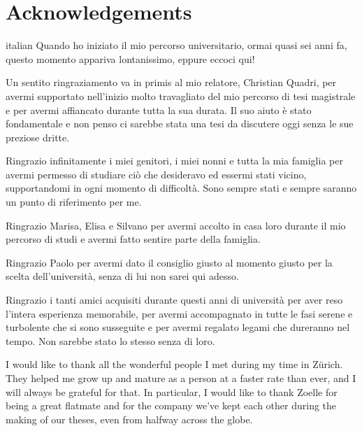{}
\chapter*{Acknowledgements}
\vspace{-0.5cm}
\begin{otherlanguage*}{italian}
Quando ho iniziato il mio percorso universitario, ormai quasi sei anni fa, questo momento appariva lontanissimo, eppure eccoci qui!

Un sentito ringraziamento va in primis al mio relatore, Christian Quadri, per avermi supportato nell'inizio molto travagliato del mio percorso di tesi magistrale e per avermi affiancato durante tutta la sua durata. Il suo aiuto è stato fondamentale e non penso ci sarebbe stata una tesi da discutere oggi senza le sue preziose dritte.

Ringrazio infinitamente i miei genitori, i miei nonni e tutta la mia famiglia per avermi permesso di studiare ciò che desideravo ed essermi stati vicino, supportandomi in ogni momento di difficoltà. Sono sempre stati e sempre saranno un punto di riferimento per me.

Ringrazio Marisa, Elisa e Silvano per avermi accolto in casa loro durante il mio percorso di studi e avermi fatto sentire parte della famiglia.

Ringrazio Paolo per avermi dato il consiglio giusto al momento giusto per la scelta dell'università, senza di lui non sarei qui adesso.

Ringrazio i tanti amici acquisiti durante questi anni di università per aver reso l'intera esperienza memorabile, per avermi accompagnato in tutte le fasi serene e turbolente che si sono susseguite e per avermi regalato legami che dureranno nel tempo. Non sarebbe stato lo stesso senza di loro.
\end{otherlanguage*}

I would like to thank all the wonderful people I met during my time in Zürich. They helped me grow up and mature as a person at a faster rate than ever, and I will always be grateful for that. In particular, I would like to thank Zoelle for being a great flatmate and for the company we've kept each other during the making of our theses, even from halfway across the globe.

